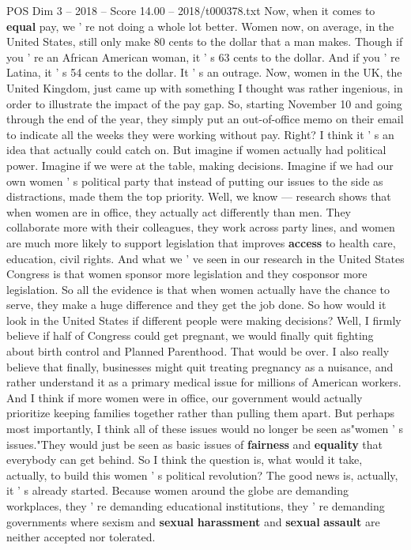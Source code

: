 \begin{textsample}{POS Dim 3 – 2018 – Score 14.00 – 2018/t000378.txt}
Now, when it comes to \textbf{equal} pay, we ' re not doing a whole lot better.
Women now, on average, in the United States, still only make 80 cents to the dollar that a man makes.
Though if you ' re an African American woman, it ' s 63 cents to the dollar.
And if you ' re Latina, it ' s 54 cents to the dollar.
It ' s an outrage.
Now, women in the UK, the United Kingdom, just came up with something I thought was rather ingenious, in order to illustrate the impact of the pay gap.
So, starting November 10 and going through the end of the year, they simply put an out-of-office memo on their email to indicate all the weeks they were working without pay.
Right?
I think it ' s an idea that actually could catch on.
But imagine if women actually had political power.
Imagine if we were at the table, making decisions.
Imagine if we had our own women ' s political party that instead of putting our issues to the side as distractions, made them the top priority.
Well, we know — research shows that when women are in office, they actually act differently than men.
They collaborate more with their colleagues, they work across party lines, and women are much more likely to support legislation that improves \textbf{access} to health care, education, civil rights.
And what we ' ve seen in our research in the United States Congress is that women sponsor more legislation and they cosponsor more legislation.
So all the evidence is that when women actually have the chance to serve, they make a huge difference and they get the job done.
So how would it look in the United States if different people were making decisions?
Well, I firmly believe if half of Congress could get pregnant, we would finally quit fighting about birth control and Planned Parenthood.
That would be over.
I also really believe that finally, businesses might quit treating pregnancy as a nuisance, and rather understand it as a primary medical issue for millions of American workers.
And I think if more women were in office, our government would actually prioritize keeping families together rather than pulling them apart.
But perhaps most importantly, I think all of these issues would no longer be seen as"women ' s issues."They would just be seen as basic issues of \textbf{fairness} and \textbf{equality} that everybody can get behind.
So I think the question is, what would it take, actually, to build this women ' s political revolution?
The good news is, actually, it ' s already started.
Because women around the globe are demanding workplaces, they ' re demanding educational institutions, they ' re demanding governments where sexism and \textbf{sexual} \textbf{harassment} and \textbf{sexual} \textbf{assault} are neither accepted nor tolerated.

\end{textsample}
